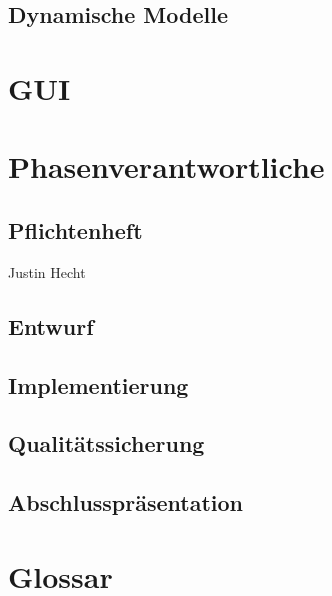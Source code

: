 \documentclass[a4paper]{scrreprt}
\begin{document}
\section{Dynamische Modelle}


\chapter{GUI}


\chapter{Phasenverantwortliche}
\section{Pflichtenheft} Justin Hecht
\section{Entwurf} 
\section{Implementierung}
\section{Qualitätssicherung} 
\section{Abschlusspräsentation} 


\chapter{Glossar}
 

 

\listoffigures
 
\end{document}
